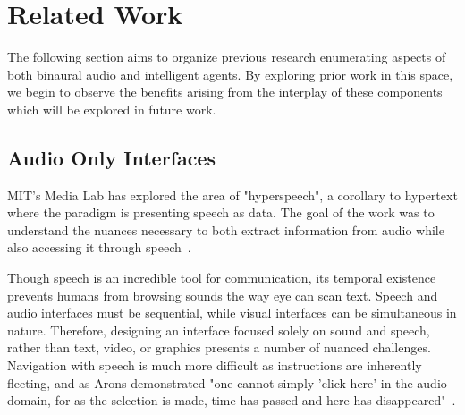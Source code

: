 \newpage                                                \chapter{Related Work}

The following section aims to organize previous research enumerating aspects
of both binaural audio and intelligent agents. By exploring prior work in this
space, we begin to observe the benefits arising from the interplay of these
components which will be explored in future work.



\section{                  Audio Only Interfaces                             }

MIT's Media Lab has explored the area of "hyperspeech", a corollary to
hypertext where the paradigm is presenting speech as data.  The goal of the
work was to understand the nuances necessary to both extract information from
audio while also accessing it through speech~\cite{arons1991hyperspeech}.

Though speech is an incredible tool for communication, its temporal existence
prevents humans from browsing sounds the way eye can scan text.  Speech and
audio interfaces must be sequential, while visual interfaces can be
simultaneous in nature.  Therefore, designing an interface focused solely on
sound and speech, rather than text, video, or graphics presents a number of
nuanced challenges.  Navigation with speech is much more difficult as
instructions are inherently fleeting, and as Arons demonstrated "one cannot simply
'click here' in the audio domain, for as the selection is made, time has passed
and here has  disappeared"~\cite{arons1991hyperspeech}.

